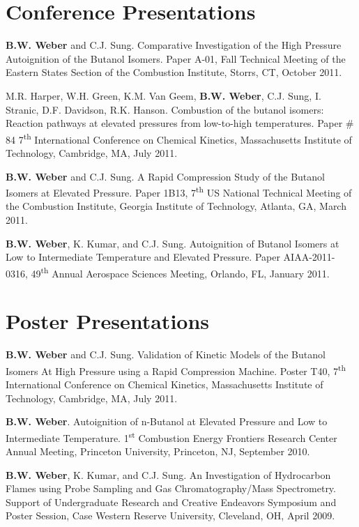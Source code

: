 \documentclass[margin,line]{res}
\newenvironment{list3}{
  \begin{list}{\ding{113}}{%
      \setlength{\itemsep}{0.1in}
      \setlength{\parsep}{0in} \setlength{\parskip}{0in}
      \setlength{\topsep}{0in} \setlength{\partopsep}{0in} 
      \setlength{\leftmargin}{0in}}}{\end{list}}
\begin{document}
\begin{resume}
\section{\sc Conference Presentations}
\begin{list3}
\item[] {\bf B.W. Weber} and C.J. Sung. Comparative Investigation of the High Pressure Autoignition of the Butanol Isomers. Paper A-01, Fall Technical Meeting of the Eastern States Section of the Combustion Institute, Storrs, CT, October 2011.
\item[] M.R. Harper, W.H. Green, K.M. Van Geem, {\bf B.W. Weber}, C.J. Sung, I. Stranic, D.F. Davidson,  R.K. Hanson. Combustion of the butanol isomers: Reaction pathways at elevated pressures 
from low-to-high temperatures. Paper \# 84 7\textsuperscript{th} International Conference on Chemical Kinetics, Massachusetts Institute of Technology, Cambridge, MA, July 2011.
\item[] {\bf B.W. Weber} and C.J. Sung. A Rapid Compression Study of the Butanol Isomers at Elevated Pressure. Paper 1B13, 7\textsuperscript{th} US National Technical Meeting of the Combustion Institute, Georgia Institute of Technology, Atlanta, GA, March 2011.
\item[] {\bf B.W. Weber}, K. Kumar, and C.J. Sung. Autoignition of Butanol Isomers at Low to Intermediate Temperature and Elevated Pressure. Paper AIAA-2011-0316, 49\textsuperscript{th} Annual Aerospace Sciences Meeting, Orlando, FL, January 2011.
\end{list3}

\section{\sc Poster Presentations}
\begin{list3}
\item[] {\bf B.W. Weber} and C.J. Sung. Validation of Kinetic Models of the Butanol Isomers At High Pressure using a Rapid Compression Machine. Poster T40, 7\textsuperscript{th} International Conference on Chemical Kinetics, Massachusetts Institute of Technology, Cambridge, MA, July 2011.
\item[] {\bf B.W. Weber}. Autoignition of n-Butanol at Elevated Pressure and Low to Intermediate Temperature. 1\textsuperscript{st} Combustion Energy Frontiers Research Center Annual Meeting, Princeton University, Princeton, NJ, September 2010.
\item[] {\bf B.W. Weber}, K. Kumar, and C.J. Sung. An Investigation of Hydrocarbon Flames using Probe Sampling and Gas Chromatography/Mass Spectrometry. Support of Undergraduate Research and Creative Endeavors Symposium and Poster Session, Case Western Reserve University, Cleveland, OH, April 2009.
\end{list3}


\end{resume}
\end{document}
